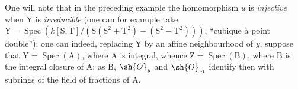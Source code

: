 \begin{env}[11.7.4]
\label{IV.11.7.4}
One will note that in the preceding example the homomorphism $u$ is \emph{injective} when $\mathrm{Y}$ is \emph{irreducible} (one can for example take $\mathrm{Y}=\operatorname{Spec}(k[\mathrm{S},\mathrm{T}]/(\mathrm{S}(\mathrm{S}^2+\mathrm{T}^2)-(\mathrm{S}^2-\mathrm{T}^2)))$, ``cubique \`a point double''); one can indeed, replacing $\mathrm{Y}$ by an affine neighbourhood of $y$, suppose that $\mathrm{Y}=\operatorname{Spec}(\mathrm{A})$, where $\mathrm{A}$ is integral, whence $\mathrm{Z}=\operatorname{Spec}(\mathrm{B})$, where $\mathrm{B}$ is the integral closure of $\mathrm{A}$; as $\mathrm{B}$, $\sh{O}_y$ and $\sh{O}_{z_1}$ identify then with subrings of the field of fractions of $\mathrm{A}$.
\end{env}


